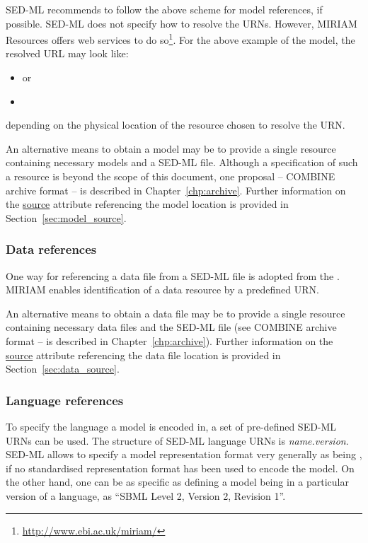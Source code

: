 SED-ML recommends to follow the above scheme for model references, if possible. 
SED-ML does not specify how to resolve the URNs. However, MIRIAM Resources offers web services to do so\footnote{\url{http://www.ebi.ac.uk/miriam/}}. For the above example of the  model, the resolved URL may look like: 
\begin{itemize}
 \item{ or}
 \item{}
\end{itemize}
depending on the physical location of the resource chosen to resolve the URN.

An alternative means to obtain a model may be to provide a single resource containing necessary models and a SED-ML file. Although a specification of such a resource is beyond the scope of this document,  one proposal  --  COMBINE archive format -- is described in Chapter~\ref{chp:archive}.
Further information on the \hyperref[sec:model_source]{source} attribute referencing the model location is provided in Section~\ref{sec:model_source}.

\subsubsection{Data references}
\label{sec:dataURI}
One way for referencing a data file from a SED-ML file is adopted from the . MIRIAM enables identification of a data resource by a predefined URN.

An alternative means to obtain a data file may be to provide a single resource containing necessary data files and the SED-ML file (see COMBINE archive format -- is described in Chapter~\ref{chp:archive}). Further information on the \hyperref[sec:data_source]{source} attribute referencing the data file location is provided in Section~\ref{sec:data_source}.

\subsubsection{Language references}
\label{sec:languageURI}
To specify the language a model is encoded in, a set of pre-defined SED-ML URNs can be used. 
The structure of SED-ML language URNs is \emph{name.version}. 
SED-ML allows to specify a model representation format very generally as being , if no standardised representation format has been used to encode the model. On the other hand, one can be as specific as defining
a model being in a particular version of a language, as ``SBML Level 2, Version 2, Revision 1''.

